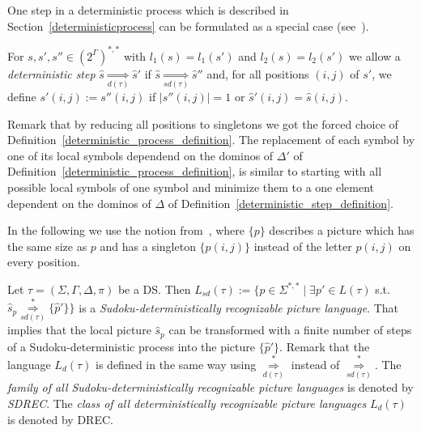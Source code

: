 One step in a deterministic process which is described in Section~\ref{deterministicprocess}
can be formulated as a special case (see~\cite{borchert2006deterministically}).
\begin{definition}
For $s, s', s'' \in (2^\Gamma)^{*,*}$ with $l_1(s) = l_1(s')$ and $l_2(s) = l_2(s')$ we allow a
\emph{deterministic step} $\hat{s} \underset{d(\tau)}{\Rightarrow} \hat{s}'$ if $\hat{s}
\underset{sd(\tau)}{\Rightarrow} \hat{s}''$ and, for all positions $(i, j)$ of $s'$, we define
$s'(i, j) := s''(i, j)$ if $\left| s''(i, j) \right| = 1$ or $\hat{s}'(i, j) = \hat{s}(i, j)$.
\label{deterministic_step_definition}
\end{definition}
Remark that by reducing all positions to singletons we got the forced choice of
Definition~\ref{deterministic_process_definition}. The replacement of each symbol by one of its
local symbols dependend on the dominos of $\Delta'$ of
Definition~\ref{deterministic_process_definition}, is similar to starting with all possible local
symbols of one symbol and minimize them to a one element dependent on the dominos of $\Delta$ of 
Definition~\ref{deterministic_step_definition}.

In the following we use the notion from~\cite{borchert2006deterministically}, where $\{p\}$
describes a picture which has the same size as $p$ and has a singleton $\{p(i, j)\}$ instead of
the letter $p(i, j)$ on every position.

Let $\tau = (\Sigma, \Gamma, \Delta, \pi)$ be a DS. Then $L_{sd}(\tau) := \{p \in \Sigma^{*,*}
\mid \exists p' \in L(\tau)$ s.t.
$\hat{s}_p \overset{*}{\underset{sd(\tau)}{\Rightarrow}} \{\hat{p}'\}\}$ is a
\emph{Sudoku-deterministically recognizable picture language}.
That implies that the local picture $\hat{s}_p$ can be transformed with a finite number of steps of
a Sudoku-deterministic process into the picture $\{\hat{p}'\}$. Remark that the language
$L_{d}(\tau)$ is defined in the same way using $\overset{*}{\underset{d(\tau)}{\Rightarrow}}$ instead of
$\overset{*}{\underset{sd(\tau)}{\Rightarrow}}$. The \emph{family of all Sudoku-deterministically
recognizable picture languages} is denoted by \emph{SDREC}. The \emph{class of all
deterministically recognizable picture languages} $L_d(\tau)$ is denoted by DREC.

